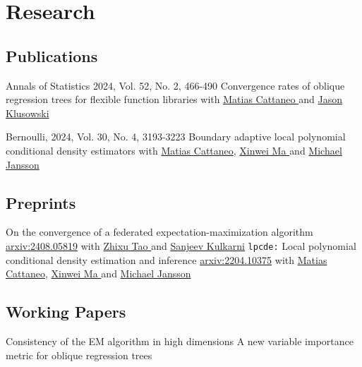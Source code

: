 \documentclass[10pt,a4paper,roman]{moderncv}        %
\begin{document}
\vspace{-0.3cm}
\section{Research}
\subsection{Publications}
\cventry{}
{Annals of Statistics 2024, Vol. 52, No. 2, 466-490}
{Convergence rates of oblique regression trees for flexible function libraries}
{}
{}
{with
  \color{blue}\href{https://cattaneo.princeton.edu}{Matias Cattaneo }\color{black} and
  \color{blue}\href{https://klusowski.princeton.edu}{Jason Klusowski}}

\cventry{}
{Bernoulli, 2024, Vol. 30, No. 4, 3193-3223}
{Boundary adaptive local polynomial conditional density estimators}
{}
{}
{with \color{blue}\href{https://cattaneo.princeton.edu}{Matias Cattaneo}\color{black},
  \color{blue}\href{https://sites.google.com/view/xinweima/home?authuser=0}{Xinwei
    Ma }\color{black}
  and
  \color{blue}\href{https://sites.google.com/berkeley.edu/michael-jansson/}{Michael
    Jansson}\color{black}
}

\subsection{Preprints}
\cventry{}
{\vspace{-0.4cm}}
{On the convergence of a federated expectation-maximization algorithm}
{\color{blue}\href{https://arxiv.org/abs/2408.05819}{arxiv:2408.05819}\color{black}}
{}
{with
  \color{blue}\href{https://www.linkedin.com/in/zhixu-tao-a02b77199/}{Zhixu Tao }\color{black} and
  \color{blue}\href{https://www.princeton.edu/~kulkarni/}{Sanjeev Kulkarni}
}
\cventry{}
{\vspace{-0.4cm}}
{\texttt{lpcde:} Local polynomial conditional density estimation and inference}
{\color{blue}\href{https://arxiv.org/abs/2204.10375}{arxiv:2204.10375}\color{black}}
{}
{with \color{blue}\href{https://cattaneo.princeton.edu}{Matias Cattaneo}\color{black},
  \color{blue}\href{https://sites.google.com/view/xinweima/home?authuser=0}{Xinwei
    Ma }\color{black}
  and
  \color{blue}\href{https://sites.google.com/berkeley.edu/michael-jansson/}{Michael
    Jansson}\color{black}
}
\subsection{Working Papers}
{Consistency of the EM algorithm in high dimensions} {}{}{}
\cventry{}{\vspace{-0.4cm}}
{A new variable importance metric for oblique regression trees} {}{}{}
\end{document}
